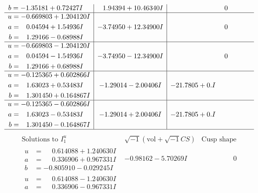 \documentclass[1p]{elsarticle_modified}
\theoremstyle{definition}
\newcommand{\I}{\sqrt{-1}}
\begin{document}
$$\begin{array}{c|c|c}
\begin{aligned}
b &= -1.35181 + 0.72427 I\end{aligned}
 & \phantom{-}1.94394 + 10.46340 I & \phantom{-0.000000 } 0 \\ \hline\begin{aligned}
u &= -0.669803 + 1.204120 I \\
a &= \phantom{-}0.04594 + 1.54936 I \\
b &= \phantom{-}1.29166 - 0.68988 I\end{aligned}
 & -3.74950 + 12.34900 I & \phantom{-0.000000 } 0 \\ \hline\begin{aligned}
u &= -0.669803 - 1.204120 I \\
a &= \phantom{-}0.04594 - 1.54936 I \\
b &= \phantom{-}1.29166 + 0.68988 I\end{aligned}
 & -3.74950 - 12.34900 I & \phantom{-0.000000 } 0 \\ \hline\begin{aligned}
u &= -0.125365 + 0.602866 I \\
a &= \phantom{-}1.63023 + 0.53483 I \\
b &= \phantom{-}1.301450 + 0.164867 I\end{aligned}
 & -1.29014 - 2.00406 I & -21.7805 + 0. I\phantom{ +0.000000I} \\ \hline\begin{aligned}
u &= -0.125365 - 0.602866 I \\
a &= \phantom{-}1.63023 - 0.53483 I \\
b &= \phantom{-}1.301450 - 0.164867 I\end{aligned}
 & -1.29014 + 2.00406 I & -21.7805 + 0. I\phantom{ +0.000000I}\\
 \hline 
 \end{array}$$\newpage$$\begin{array}{c|c|c}  
\text{Solutions to }I^u_{1}& \I (\text{vol} + \sqrt{-1}CS) & \text{Cusp shape}\\
 \hline 
\begin{aligned}
u &= \phantom{-}0.614088 + 1.240630 I \\
a &= \phantom{-}0.336906 + 0.967331 I \\
b &= -0.805910 - 0.029245 I\end{aligned}
 & -0.98162 - 5.70269 I & \phantom{-0.000000 } 0 \\ \hline\begin{aligned}
u &= \phantom{-}0.614088 - 1.240630 I \\
a &= \phantom{-}0.336906 - 0.967331 I \\

\end{aligned}
\end{array}$$
\end{document}
